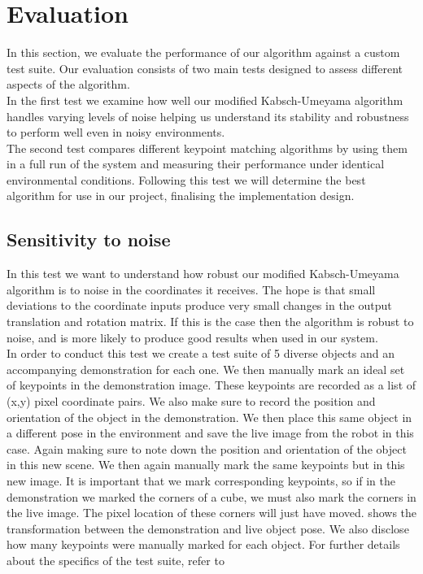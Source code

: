 \chapter{Evaluation}
\label{chap:evaluation}
In this section, we evaluate the performance of our algorithm against a custom test suite. Our evaluation consists of two main tests designed to assess different aspects of the algorithm.\\
In the first test we examine how well our modified Kabsch-Umeyama algorithm handles varying levels of noise helping us understand its stability and robustness to perform well even in noisy environments.\\
The second test compares different keypoint matching algorithms by using them in a full run of the system and measuring their performance under identical environmental conditions. Following this test we will determine the best algorithm for use in our project, finalising the implementation design.

\section{Sensitivity to noise}
\label{sec:noise-test}
In this test we want to understand how robust our modified Kabsch-Umeyama algorithm is to noise in the coordinates it receives. The hope is that small deviations to the coordinate inputs produce very small changes in the output translation and rotation matrix. If this is the case then the algorithm is robust to noise, and is more likely to produce good results when used in our system.\\

In order to conduct this test we create a test suite of 5 diverse objects and an accompanying demonstration for each one. We then manually mark an ideal set of keypoints in the demonstration image. These keypoints are recorded as a list of (x,y) pixel coordinate pairs. We also make sure to record the position and orientation of the object in the demonstration.
We then place this same object in a different pose in the environment and save the live image from the robot in this case. Again making sure to note down the position and orientation of the object in this new scene. We then again manually mark the same keypoints but in this new image. It is important that we mark corresponding keypoints, so if in the demonstration we marked the corners of a cube, we must also mark the corners in the live image. The pixel location of these corners will just have moved.  shows the transformation between the demonstration and live object pose. We also disclose how many keypoints were manually marked for each object. For further details about the specifics of the test suite, refer to \\


